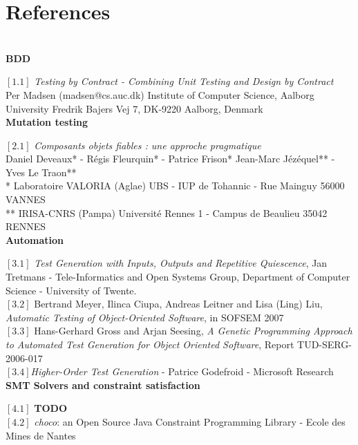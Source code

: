 \documentclass[a4paper]{report}
\begin{document}
\section*{References}
$ $\\
\newline
\textbf{BDD}\\
\newline
$[1.1]$ \textit{Testing by Contract
- Combining Unit Testing and Design by Contract}\\
Per Madsen (madsen@cs.auc.dk)
Institute of Computer Science, Aalborg University
Fredrik Bajers Vej 7, DK-9220 Aalborg, Denmark\\
\newline
\textbf{Mutation testing}\\
\newline
$[2.1]$ \textit{Composants objets fiables :
une approche pragmatique}\\
Daniel Deveaux* - Régis Fleurquin* - Patrice Frison*
Jean-Marc Jézéquel** - Yves Le Traon**\\
* Laboratoire VALORIA (Aglae)
UBS - IUP de Tohannic - Rue Mainguy
56000 VANNES\\
** IRISA-CNRS (Pampa)
Université Rennes 1 - Campus de Beaulieu
35042 RENNES\\
\newline
\textbf{Automation}\\
\newline
$[3.1]$ \textit{Test Generation with Inputs, Outputs and Repetitive Quiescence}, Jan Tretmans - Tele-Informatics and Open Systems Group, Department of Computer Science - University of Twente.\\
\newline
$[3.2]$ Bertrand Meyer, Ilinca Ciupa, Andreas Leitner and Lisa (Ling) Liu, \textit{Automatic Testing of Object-Oriented Software}, in SOFSEM 2007\\
\newline
$[3.3]$ Hans-Gerhard Gross and Arjan Seesing, 
\textit{A Genetic Programming Approach to Automated Test Generation for Object Oriented Software}, Report TUD-SERG-2006-017\\
\newline
$[3.4]$\textit{Higher-Order Test Generation} - 
Patrice Godefroid - 
Microsoft Research\\
\newline
\textbf{SMT Solvers and constraint satisfaction}\\
\newline
$[4.1]$ {\color{red} \textbf{TODO}}\\
\newline
$[4.2]$ \textit{choco}: an Open Source Java Constraint Programming Library - Ecole des Mines de Nantes\\
\end{document}

